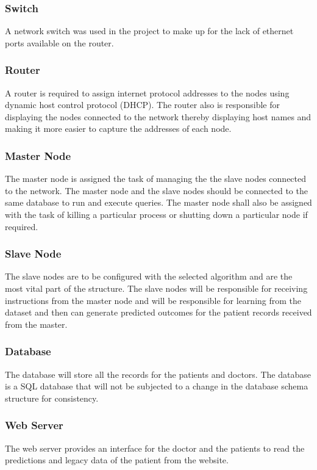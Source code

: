 \documentclass[12pt]{article}
\begin{document}
\subsubsection{Switch}
A network switch was used in the project to make up for the lack of ethernet ports available on the router.

\subsubsection{Router}
A router is required to assign internet protocol addresses to the nodes using dynamic host control protocol (DHCP). The router also is responsible for displaying the nodes connected to the network thereby displaying host names and making it more easier to capture the addresses of each node.

\subsubsection{Master Node}
The master node is assigned the task of managing the the slave nodes connected to the network. The master node and the slave nodes should be connected to the same database to run and execute queries. The master node shall also be assigned with the task of killing a particular process or shutting down a particular node if required.

\subsubsection{Slave Node}
The slave nodes are to be configured with the selected algorithm and are the most vital part of the structure. The slave nodes will be responsible for receiving instructions from the master node and will be responsible for learning from the dataset and then can generate predicted outcomes for the patient records received from the master. 

\subsubsection{Database}
The database will store all the records for the patients and doctors. The database is a SQL database that will not be subjected to a change in the database schema structure for consistency.

\subsubsection{Web Server}
The web server provides an interface for the doctor and the patients to read the predictions and legacy data of the patient from the website.
\end{document}
